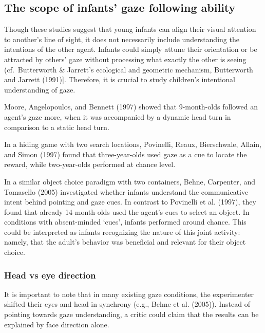 \documentclass[
  man,floatsintext]{apa6}
\begin{document}
\hypertarget{the-scope-of-infants-gaze-following-ability}{%
\subsection{The scope of infants' gaze following ability}\label{the-scope-of-infants-gaze-following-ability}}

Though these studies suggest that young infants can align their visual attention to another's line of sight, it does not necessarily include understanding the intentions of the other agent.
Infants could simply attune their orientation or be attracted by others' gaze without processing what exactly the other is seeing (cf.~Butterworth \& Jarrett's ecological and geometric mechanism, Butterworth and Jarrett (1991){]}. Therefore, it is crucial to study children's intentional understanding of gaze.

Moore, Angelopoulos, and Bennett (1997) showed that 9-month-olds followed an agent's gaze more, when it was accompanied by a dynamic head turn in comparison to a static head turn.

In a hiding game with two search locations, Povinelli, Reaux, Bierschwale, Allain, and Simon (1997) found that three-year-olds used gaze as a cue to locate the reward, while two-year-olds performed at chance level.

In a similar object choice paradigm with two containers, Behne, Carpenter, and Tomasello (2005) investigated whether infants understand the communicative intent behind pointing and gaze cues.
In contrast to Povinelli et al. (1997), they found that already 14-month-olds used the agent's cues to select an object.
In conditions with absent-minded `cues', infants performed around chance.
This could be interpreted as infants recognizing the nature of this joint activity: namely, that the adult's behavior was beneficial and relevant for their object choice.

\hypertarget{head-vs-eye-direction}{%
\subsubsection{Head vs eye direction}\label{head-vs-eye-direction}}

It is important to note that in many existing gaze conditions, the experimenter shifted their eyes and head in synchrony (e.g., Behne et al. (2005)).
Instead of pointing towards gaze understanding, a critic could claim that the results can be explained by face direction alone.
\end{document}
